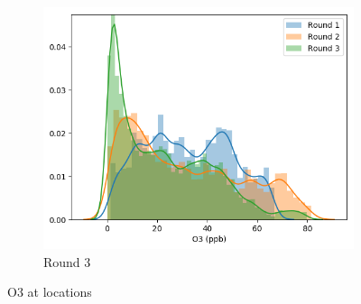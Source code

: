 \documentclass[journal abbreviation, manuscript]{copernicus}
\begin{document}
\begin{figure}[H]
\begin{subfigure}{0.32\textwidth}
\includegraphics[width=\textwidth]{results/distributions/location_shafter_o3.png}
\caption{Round 3}
\end{subfigure}
\caption{O3 at locations}
\label{fig:o3-locations}
\end{figure}
\end{document}
